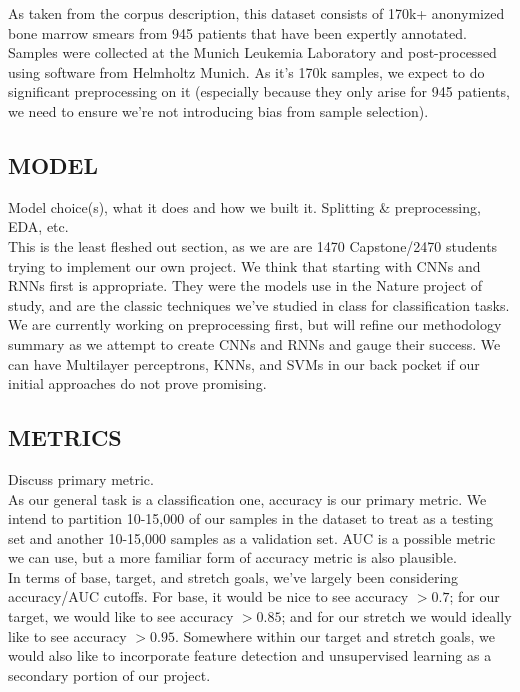 \documentclass[%
 reprint,
 amsmath,amssymb,
 aps,
]{revtex4-1}
\begin{document}
As taken from the corpus description, this dataset \cite{Bone Marrow Cell Data} consists of 170k+ anonymized bone marrow smears from 945 patients that have been expertly annotated. Samples were collected at the Munich Leukemia Laboratory and post-processed using software from Helmholtz Munich. As it's 170k samples, we expect to do significant preprocessing on it (especially because they only arise for 945 patients, we need to ensure we're not introducing bias from sample selection). \\


\subsection{\label{sec:level2}MODEL}
Model choice(s), what it does and how we built it. Splitting \& preprocessing, EDA, etc. \\

This is the least fleshed out section, as we are are 1470 Capstone/2470 students trying to implement our own project. We think that starting with CNNs and RNNs first is appropriate. They were the models use in the Nature project of study, and are the classic techniques we've studied in class for classification tasks. We are currently working on preprocessing first, but will refine our methodology summary as we attempt to create CNNs and RNNs and gauge their success. We can have Multilayer perceptrons, KNNs, and SVMs in our back pocket if our initial approaches do not prove promising. \\

\subsection{\label{sec:level2}METRICS}
Discuss primary metric. \\

As our general task is a classification one, accuracy is our primary metric. We intend to partition 10-15,000 of our samples in the dataset to treat as a testing set and another 10-15,000 samples as a validation set. AUC is a possible metric we can use, but a more familiar form of accuracy metric is also plausible. \\

In terms of base, target, and stretch goals, we've largely been considering accuracy/AUC cutoffs. For base, it would be nice to see accuracy $>0.7$; for our target, we would like to see accuracy $>0.85$; and for our stretch we would ideally like to see accuracy $>0.95$. Somewhere within our target and stretch goals, we would also like to incorporate feature detection and unsupervised learning as a secondary portion of our project. \\
\end{document}

